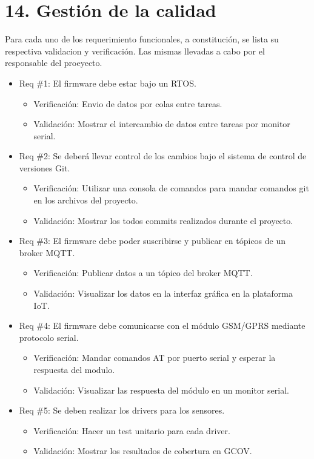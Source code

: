 \documentclass[
11pt, %
codirector, %
]{charter}
\begin{document}
\section{14. Gestión de la calidad}
\label{sec:calidad}
Para cada uno de los requerimiento funcionales, a constitución, se lista su respectiva validacion y verificación. Las mismas llevadas a cabo por el responsable del proeyecto.

\begin{itemize} 
	\item Req \#1: El firmware debe estar bajo un RTOS.
	\begin{itemize}
		\item Verificación: Envio de datos por colas entre tareas.
		\item Validación: Mostrar el intercambio de datos entre tareas por monitor serial. 
	\end{itemize}

	\item Req \#2: Se deberá llevar control de los cambios bajo el sistema de control de versiones Git.
	\begin{itemize}
		\item Verificación: Utilizar una consola de comandos para mandar comandos git en los archivos del proyecto.
		\item Validación: Mostrar los todos commits realizados durante el proyecto.  
	\end{itemize}

	\item Req \#3: El firmware debe poder suscribirse y publicar en tópicos de un broker MQTT.
	\begin{itemize}
		\item Verificación: Publicar datos a un tópico del broker MQTT.
		\item Validación: Visualizar los datos en la interfaz gráfica en la plataforma IoT. 
	\end{itemize}

	\item Req \#4: El firmware debe comunicarse con el módulo GSM/GPRS mediante protocolo serial.
	\begin{itemize}
		\item Verificación: Mandar comandos AT por puerto serial y esperar la respuesta del modulo.
		\item Validación: Visualizar las respuesta del  módulo en un monitor serial.  
	\end{itemize}

	\item Req \#5: Se deben realizar los drivers para los sensores.
	\begin{itemize}
		\item Verificación: Hacer un test unitario para cada driver.
		\item Validación: Mostrar los resultados de cobertura en GCOV. 
	\end{itemize}


\end{itemize}
\end{document}
